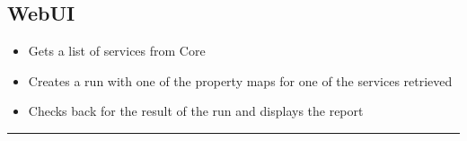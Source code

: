 \documentclass[12pt]{article}
\begin{document}
\subsection{WebUI}\label{webui}

\begin{itemize}
\item
  Gets a list of services from Core
\item
  Creates a run with one of the property maps for one of the services
  retrieved
\item
  Checks back for the result of the run and displays the report
\end{itemize}

\begin{center}\rule{0.5\linewidth}{\linethickness}\end{center}



\end{document}
